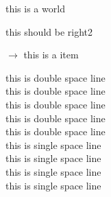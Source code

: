 \documentclass{article}
\begin{document}
this is a world
\begin{flushright}
    this should be right2
\end{flushright}

$\rightarrow $ this is a item

\noindent
\doublespacing
this is double space line \\
this is double space line \\
this is double space line \\
this is double space line \\
this is double space line \\

\singlespacing
this is single space line \\
this is single space line \\
this is single space line \\
this is single space line \\
\end{document}
